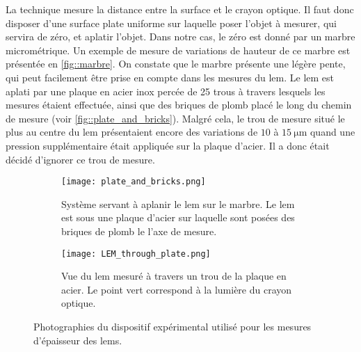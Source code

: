            La technique mesure la distance entre la surface et le crayon optique. Il faut donc disposer d'une surface plate uniforme sur laquelle poser l'objet à mesurer, qui servira de zéro, et aplatir l'objet. Dans notre cas, le zéro est donné  par un marbre micrométrique. Un exemple de mesure de variations de hauteur de ce marbre est présentée en \autoref{fig::marbre}. On constate que le marbre présente une légère pente, qui peut facilement être prise en compte dans les mesures du \gls{lem}. Le \gls{lem} est aplati par une plaque en acier inox percée de 25 trous à travers lesquels les mesures étaient effectuée, ainsi que des briques de plomb placé le long du chemin de mesure (voir \autoref{fig::plate_and_bricks}). Malgré cela, le trou de mesure situé le plus au centre du \gls{lem} présentaient encore des variations de $10$ à $\SI{15}{\micro\meter}$ quand une pression supplémentaire était appliquée sur la plaque d'acier. Il a donc était décidé d'ignorer ce trou de mesure.

          \begin{figure}[htpb]
            \begin{subfigure}[t]{0.5\textwidth}
              \centering
              \texttt{[image: plate\_and\_bricks.png]}
              \caption{\label{fig::plate_and_bricks}Système servant à aplanir le \gls{lem} sur le marbre. Le \gls{lem} est sous une plaque d'acier sur laquelle sont posées des briques de plomb le l'axe de mesure.}
            \end{subfigure}
            \hfill
            \begin{subfigure}[t]{0.395\textwidth}
              \centering
              \texttt{[image: LEM\_through\_plate.png]}
              \caption{\label{fig::LEM_through_plate}Vue du \gls{lem} mesuré à travers un trou de la plaque en acier. Le point vert correspond à la lumière du crayon optique.}
            \end{subfigure}
            \caption[Photographies du dispositif expérimental utilisé pour les mesures d'épaisseur des LEMs.]{\label{fig::dispositif_experimental}Photographies du dispositif expérimental utilisé pour les mesures d'épaisseur des \glspl{lem}.}
          \end{figure}

